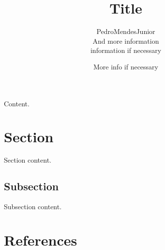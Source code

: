 



\renewcommand\highlightauthorname[1]{#1}

\title{Title}
\author{\gls{PedroMendesJunior}\\%
  And more information\\%
  information if necessary\\%
}
\date{More info if necessary}



\maketitle

Content.

\section*{Section}

Section content.

\subsection*{Subsection}

Subsection content.

\section*{References}

\begin{publications}
  \\

\end{publications}




